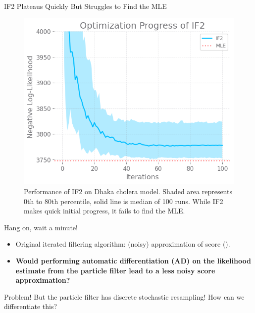 \documentclass{beamer}
\begin{document}
\begin{frame}{IF2 Plateaus Quickly But Struggles to Find the MLE}
\begin{figure}
    \centering
    \includegraphics[scale=0.5]{imgs/095/if2fail.png}
    \caption{Performance of IF2 on \cite{king08} Dhaka cholera model. Shaded area represents 0th to 80th percentile, solid line is median of 100 runs. While IF2 makes quick initial progress, it fails to find the MLE.}
    \label{fig:if2fail}
\end{figure}
\end{frame}

\begin{frame}{Hang on, wait a minute!}
    \begin{itemize}
        \item Original iterated filtering algorithm: (noisy) approximation of score (\cite{ionides06-pnas}). 
        \pause
        \item \textbf{Would performing automatic differentiation (AD) on the likelihood estimate from the particle filter lead to a less noisy score approximation?}
    \end{itemize}
    \pause
    \begin{block}{Problem!}
        But the particle filter has discrete stochastic resampling! How can we differentiate this?
    \end{block}
\end{frame}
\end{document}
